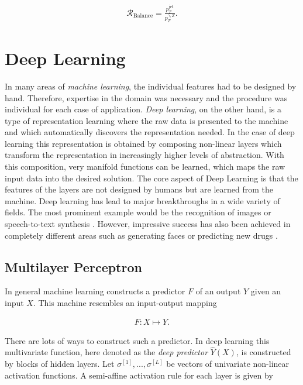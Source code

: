 \documentclass[12pt, a4paper]{thesis}
\begin{document}
\begin{align}
\mathcal{R}_{\text{Balance}}=\frac{p_T^{\text{jet}}}{p_T^{\gamma,Z}}.
\end{align}

\chapter{Deep Learning}
\label{sec:org1ca4c32}

In many areas of \emph{machine learning}, the individual features had
to be designed by hand. Therefore, expertise in the domain was
necessary and the procedure was individual for each case of
application.  \emph{Deep learning}, on the other hand, is a type of
representation learning where the raw data is presented to the machine
and which automatically discovers the representation needed. In the
case of deep learning this representation is obtained by composing
non-linear layers which transform the representation in increasingly
higher levels of abstraction.  With this composition, very manifold
functions can be learned, which maps the raw input data into the
desired solution. The core aspect of Deep Learning is that the
features of the layers are not designed by humans but are learned from
the machine.  Deep learning has lead to major breakthroughs in a wide
variety of fields. The most prominent example would be the recognition
of images \cite{szegedy15,NIPS2014_5573,farabet13,krizhevsky17} or
speech-to-text synthesis
\cite{mikolov11_strat,hinton-speech,sainath13_deep} . However,
impressive success has also been achieved in completely different
areas such as generating faces
\cite{karras17_progr_growin_gans_improv_qualit_stabil_variat} or
predicting new drugs \cite{ma15_deep_neural_nets_as_method}.

\section{Multilayer Perceptron}
\label{sec:org1b5c208}

In general machine learning constructs a predictor \(F\) of an output \(Y\) given an
input \(X\). This machine resembles an input-output mapping

\begin{align}
 F : X \mapsto Y.
\end{align}

There are lots of ways to construct such a predictor. In deep learning this
multivariate function, here denoted as the \emph{deep predictor} \(\hat{Y}(X)\), is
constructed by blocks of hidden layers. Let \(\sigma^{[1]},...,\sigma^{[L]}\) be vectors of
univariate non-linear activation functions. A semi-affine activation rule for
each layer is given by
\end{document}
